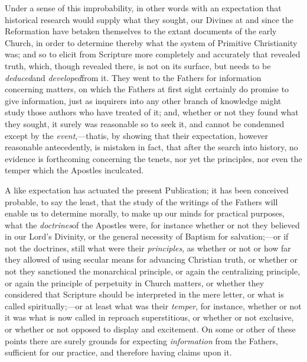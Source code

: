 Under a sense of this
improbability, in other words with an expectation that historical
research would supply what they sought, our Divines at and since the
Reformation have betaken themselves to the extant documents of the
early Church, in order to determine thereby what the system of
Primitive Christianity was; and so to elicit from Scripture more
completely and accurately that revealed truth, which, though revealed
there, is not on its surface, but needs to be \emph{deduced}and \emph{developed}from it. They went to the Fathers for information concerning
matters, on which the Fathers at first sight certainly do promise to
give information, just as inquirers into any other branch of knowledge
might study those authors who have treated of it; and, whether
or not they found what they sought, it surely was reasonable so to
seek it, and cannot be condemned except by the \emph{event},—that\emph{}is, by showing that their expectation, however reasonable
antecedently, is mistaken in fact, that after the search into history,
no evidence is forthcoming concerning the tenets, nor yet the
principles, nor even the temper which the Apostles inculcated.

A like expectation has
actuated the present Publication; it has been conceived probable, to
say the least, that the study of the writings of the Fathers will
enable us to determine morally, to make up our minds for practical
purposes, what the \emph{doctrines}of the Apostles were, for instance
whether or not they believed in our Lord's Divinity, or the general
necessity of Baptism for salvation;—or if not the doctrines, still
what were their \emph{principles}, as whether or not or how far they
allowed of using secular means for advancing Christian truth, or
whether or not they sanctioned the monarchical principle, or again the
centralizing principle, or again the principle of perpetuity in Church
matters, or whether they considered that Scripture should be
interpreted in the mere letter, or what is called spiritually;—or at
least what was their \emph{temper}, for instance, whether or not it
was what is now called in reproach superstitious, or whether or not
exclusive, or whether or not opposed to display and excitement. On
some or other of these points there are surely grounds for expecting \emph{information}
from the Fathers, sufficient for our practice, and therefore having
claims upon it.

